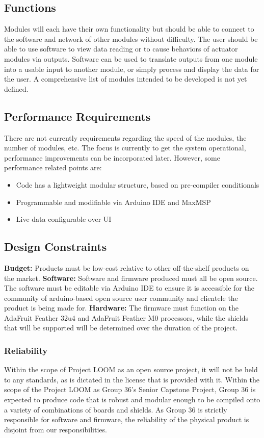 \documentclass[onecolumn, draftclsnofoot,10pt, compsoc]{IEEEtran}
\begin{document}
	\subsection{Functions}
	Modules will each have their own functionality but should be able to connect to the software and network of other modules without difficulty. The user should be able to use software to view data reading or to cause behaviors of actuator modules via outputs. Software can be used to translate outputs from one module into a usable input to another module, or simply process and display the data for the user. A comprehensive list of modules intended to be developed is not yet defined.

	\subsection{Performance Requirements}
	There are not currently requirements regarding the speed of the modules, the number of modules, etc. The focus is currently to get the system operational, performance improvements can be incorporated later. However, some performance related points are:
	\begin{itemize}
		\item Code has a lightweight modular structure, based on pre-compiler conditionals
		\item Programmable and modifiable via Arduino IDE and MaxMSP
		\item Live data configurable over UI 
	\end{itemize}

	\subsection{Design Constraints}
		\textbf{Budget:} Products must be low-cost relative to other off-the-shelf products on the market. \newline
		\textbf{Software:} Software and firmware produced must all be open source. The software must be editable via Arduino IDE to ensure it is accessible for the community of arduino-based open source user community and clientele the product is being made for. \newline
		\textbf{Hardware:} The firmware must function on the AdaFruit Feather 32u4 and AdaFruit Feather M0 processors, while the shields that will be supported will be determined over the duration of the project.

		\subsubsection{Reliability}
		Within the scope of Project LOOM as an open source project, it will not be held to any standards, as is dictated in the license that is provided with it.
		Within the scope of the Project LOOM as Group 36's Senior Capstone Project, Group 36 is expected to produce code that is robust and modular enough to be compiled onto a variety of combinations of boards and shields. As Group 36 is strictly responsible for software and firmware, the reliability of the physical product is disjoint from our responsibilities.
\end{document}
